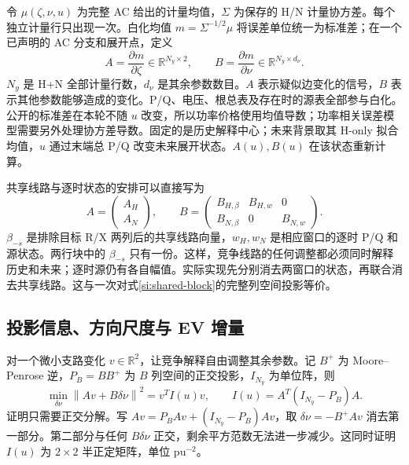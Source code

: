 \documentclass[UTF8,fontset=fandol,11pt,a4paper]{ctexart}
\newcommand{\R}{\mathbb R}
\newcommand{\norm}[1]{\left\lVert#1\right\rVert}
\begin{document}
令 $\mu(\zeta,\nu,u)$ 为完整 AC 给出的计量均值，$\Sigma$ 为保存的 H/N 计量协方差。每个独立计量行只出现一次。白化均值 $m=\Sigma^{-1/2}\mu$ 将误差单位统一为标准差；在一个已声明的 AC 分支和展开点，定义
\begin{equation}
 A=\frac{\partial m}{\partial\zeta}\in\R^{N_y\times2},\qquad
 B=\frac{\partial m}{\partial\nu}\in\R^{N_y\times d_\nu}.
 \label{si:AB}
\end{equation}
$N_y$ 是 H+N 全部计量行数，$d_\nu$ 是其余参数数目。$A$ 表示疑似边变化的信号，$B$ 表示其他参数能够造成的变化。P/Q、电压、根总表及存在时的源表全部参与白化。公开的标准差在本轮不随 $u$ 改变，所以功率价格使用均值导数；功率相关误差模型需要另外处理协方差导数。固定的是历史解释中心；未来背景取其 H-only 拟合均值，$u$ 通过末端总 P/Q 改变未来展开状态。$A(u),B(u)$ 在该状态重新计算。

共享线路与逐时状态的安排可以直接写为
\begin{equation}
 A=\begin{pmatrix}A_H\\A_N\end{pmatrix},\qquad
 B=\begin{pmatrix}
 B_{H,\beta}&B_{H,w}&0\\
 B_{N,\beta}&0&B_{N,w}
 \end{pmatrix}.
 \label{si:shared-block}
\end{equation}
$\beta_{-s}$ 是排除目标 R/X 两列后的共享线路向量，$w_H,w_N$ 是相应窗口的逐时 P/Q 和源状态。两行块中的 $\beta_{-s}$ 只有一份。这样，竞争线路的任何调整都必须同时解释历史和未来；逐时源仍有各自幅值。实际实现先分别消去两窗口的状态，再联合消去共享线路。这与一次对式\eqref{si:shared-block}的完整列空间投影等价。

\subsection{投影信息、方向尺度与 EV 增量}

对一个微小支路变化 $v\in\R^2$，让竞争解释自由调整其余参数。记 $B^+$ 为 Moore--Penrose 逆，$P_B=BB^+$ 为 $B$ 列空间的正交投影，$I_{N_y}$ 为单位阵，则
\begin{equation}
 \boxed{\min_{\delta\nu}\norm{Av+B\delta\nu}^2
 =v^T I(u)v,\qquad I(u)=A^T(I_{N_y}-P_B)A.}
 \label{si:projection}
\end{equation}
证明只需要正交分解。写 $Av=P_BAv+(I_{N_y}-P_B)Av$，取 $\delta\nu=-B^+Av$ 消去第一部分。第二部分与任何 $B\delta\nu$ 正交，剩余平方范数无法进一步减少。这同时证明 $I(u)$ 为 $2\times2$ 半正定矩阵，单位 pu$^{-2}$。
\end{document}
